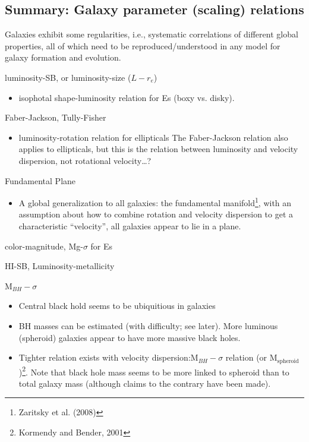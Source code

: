 \documentclass{article}
\newcommand{\mynotes}[1]{\textcolor{cadmiumgreen}{#1}}
\begin{document}
\subsection{Summary: Galaxy parameter (scaling) relations}
Galaxies exhibit some regularities, i.e., systematic correlations of different
global properties, all of which need to be reproduced/understood in any model
for galaxy formation and evolution.
\begin{description}[style=nextline,labelindent=0.2in]
    \item [Structural] luminosity-SB, or luminosity-size ($L-r_{e}$)
        \begin{itemize}
            \item isophotal shape-luminosity relation for Es
                (boxy vs. disky).
        \end{itemize}
    \item [Kinematic] Faber-Jackson, Tully-Fisher
        \begin{itemize}
            \item luminosity-rotation relation for ellipticals
                \mynotes{The Faber-Jackson relation also applies to
                ellipticals, but this is the relation between luminosity
                and velocity dispersion, not rotational velocity\ldots?}
        \end{itemize}
    \item [Structural/kinematic] Fundamental Plane
        \begin{itemize}
            \item A global generalization to all galaxies: the fundamental
                manifold\footnote{Zaritsky et al. (2008)}, with an
                assumption about how to combine rotation and velocity
                dispersion to get a characteristic ``velocity'', all galaxies
                appear to lie in a plane.
        \end{itemize}
    \item [Stellar populations] color-magnitude, Mg-$\sigma$ for Es
    \item [Gas] HI-SB, Luminosity-metallicity
    \item [Black holes] M$_{BH}-\sigma$
        \begin{itemize}
            \item Central black hold seems to be ubiquitious in galaxies
            \item BH masses can be estimated (with difficulty; see later).
                More luminous (spheroid) galaxies appear to have more
                massive black holes.
            \item Tighter relation exists with velocity
                dispersion:M$_{BH}-\sigma$ relation
                (or M$_{\mathrm{spheroid}}$)\footnote{Kormendy and
                Bender, 2001}. Note that black hole mass seems to be
                more linked to spheroid than to total galaxy mass
                (although claims to the contrary have been made).
        \end{itemize}
\end{description}
\end{document}
